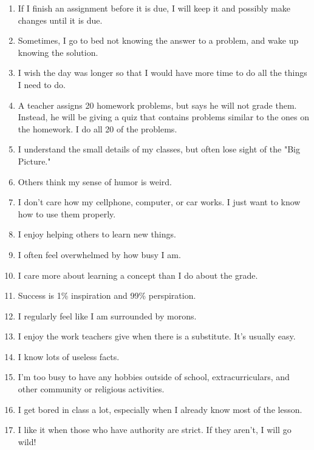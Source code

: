 \documentclass[letterpaper, 12pt]{article}
\begin{document}
\begin{enumerate}
    \item [\rule{0.3in}{0.01in} 14.]If I finish an assignment before it is due, I will keep it and possibly make changes until it is due.
    \item [\rule{0.3in}{0.01in} 15.]Sometimes, I go to bed not knowing the answer to a problem, and wake up knowing the solution.
    \item [\rule{0.3in}{0.01in} 16.]I wish the day was longer so that I would have more time to do all the things I need to do.
    \item [\rule{0.3in}{0.01in} 17.]A teacher assigns 20 homework problems, but says he will not grade them.  Instead, he will be giving a quiz that contains problems similar to the ones on the homework.  I do all 20 of the problems. 
    \item [\rule{0.3in}{0.01in} 18.]I understand the small details of my classes, but often lose sight of the "Big Picture."
    \item [\rule{0.3in}{0.01in} 19.]Others think my sense of humor is weird.
    \item [\rule{0.3in}{0.01in} 20.]I don't care how my cellphone, computer, or car works. I just want to know how to use them properly.
    \item [\rule{0.3in}{0.01in} 21.]I enjoy helping others to learn new things. 
    \item [\rule{0.3in}{0.01in} 22.]I often feel overwhelmed by how busy I am.
    \item [\rule{0.3in}{0.01in} 23.]I care more about learning a concept than I do about the grade.
    \item [\rule{0.3in}{0.01in} 24.]Success is 1\% inspiration and 99\% perspiration.
    \item [\rule{0.3in}{0.01in} 25.]I regularly feel like I am surrounded by morons.
    \item [\rule{0.3in}{0.01in} 26.]I enjoy the work teachers give when there is a substitute.  It's usually easy.
    \item [\rule{0.3in}{0.01in} 27.]I know lots of useless facts.
    \item [\rule{0.3in}{0.01in} 28.]I'm too busy to have any hobbies outside of school, extracurriculars, and other community or religious activities.
    \item [\rule{0.3in}{0.01in} 29.]I get bored in class a lot, especially when I already know most of the lesson.  
    \item [\rule{0.3in}{0.01in} 30.]I like it when those who have authority are strict.  If they aren't, I will go wild!
    
    
    
\end{enumerate}
\end{document}
